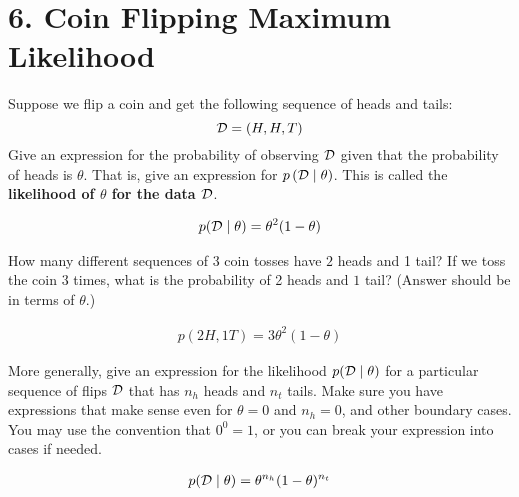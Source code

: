 \documentclass[12pt,letterpaper]{article}
\begin{document}
\section*{6. Coin Flipping Maximum Likelihood}
\begin{problem}{6.1}
    Suppose we flip a coin and get the following sequence
    of heads and tails:
    \[
    \mathcal{D}=(H,H,T)
    \]
    Give an expression for the probability of observing $\mathcal{D}$ given that
    the probability of heads is $\theta$. That is, give an expression
    for $p\left(\mathcal{D}\mid\theta\right)$. This is called the \textbf{likelihood
    of $\theta$ for the data $\mathcal{D}$}.
\end{problem}
\begin{solution}{}
    \begin{align*}
        p(\mathcal{D}\mid\theta) = \theta^2(1-\theta)
    \end{align*}
\end{solution}
\newpage

\begin{problem}{6.2}
    How many different sequences of 3 coin tosses have
    $2$ heads and 1 tail? If we toss the coin $3$ times, what is the
    probability of 2 heads and $1$ tail? (Answer should be in terms of
    $\theta$.)
\end{problem}
\begin{solution}{}
    \begin{align*}
        p(2H,1T) = 3\theta^2(1-\theta)
    \end{align*}
\end{solution}
\newpage

\begin{problem}{6.3}
    More generally, give an expression for the likelihood
    $p(\mathcal{D}\mid\theta)$ for a particular sequence of flips $\mathcal{D}$ that
    has $n_{h}$ heads and $n_{t}$ tails. Make sure you have expressions
    that make sense even for $\theta=0$ and $n_{h}=0$, and other boundary
    cases. You may use the convention that $0^{0}=1$, or you can break
    your expression into cases if needed.
\end{problem}
\begin{solution}{}
    \begin{align*}
        p(\mathcal{D}\mid\theta) = \theta^{n_h}(1-\theta)^{n_t}
    \end{align*}
\end{solution}
\newpage
\end{document}
